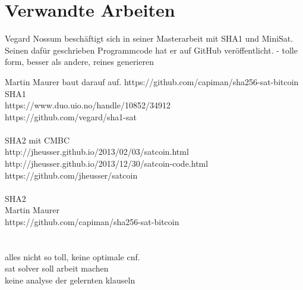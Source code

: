 \section{Verwandte Arbeiten}
\label{sec:otherwork}

Vegard Nossum beschäftigt sich in seiner Masterarbeit \cite{vegard:1} mit SHA1 und MiniSat.
Seinen dafür geschrieben Programmcode hat er auf GitHub \cite{vegard:2} veröffentlicht.
 - tolle form, besser als andere, reines generieren

Martin Maurer baut darauf auf.
https://github.com/capiman/sha256-sat-bitcoin \cite{capiman}\\

SHA1\\
https://www.duo.uio.no/handle/10852/34912 \cite{vegard:1}\\
https://github.com/vegard/sha1-sat \cite{vegard:2}\\
~\\
SHA2 mit CMBC\\
http://jheusser.github.io/2013/02/03/satcoin.html \cite{jona:1}\\
http://jheusser.github.io/2013/12/30/satcoin-code.html \cite{jona:2}\\
https://github.com/jheusser/satcoin \cite{jona:3}\\
~\\
SHA2\\
Martin Maurer\\
https://github.com/capiman/sha256-sat-bitcoin \cite{capiman}\\
~\\
~\\
alles nicht so toll, keine optimale cnf.\\
sat solver soll arbeit machen\\
keine analyse der gelernten klauseln

